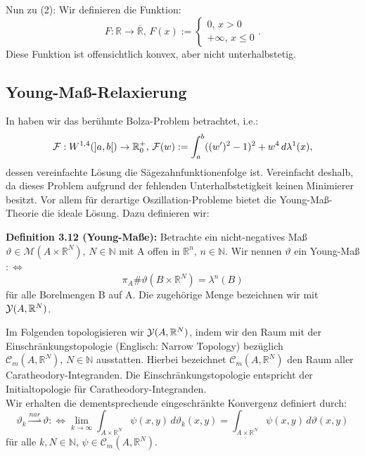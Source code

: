 Nun zu (2): Wir definieren die Funktion:
\begin{equation}
    F:\mathbb{R} \to \overline{\mathbb{R}},\,F(x):=\begin{cases}0, \,x > 0 \\+ \infty, \, x \leq 0 \end{cases}.
\end{equation}
Diese Funktion ist offensichtlich konvex, aber nicht unterhalbstetig.\QEDB

\subsection{Young-Maß-Relaxierung}{\label{subsec:relaxyoung}}
In \cite{RelaxPaper} haben wir das berühmte Bolza-Problem betrachtet, i.e.:
\begin{equation}{\label{eq3.34}}
    \mathcal{F}:W^{1,4}(]a,b[) \to \mathbb{R}_0^+,\,\mathcal{F}(w) := \int_{a}^b ((w')^2 - 1)^2 + w^4\,d\lambda^1(x),
\end{equation}
dessen vereinfachte Lösung die Sägezahnfunktionenfolge ist. Vereinfacht deshalb, da dieses Problem aufgrund der fehlenden Unterhalbstetigkeit keinen Minimierer besitzt. Vor allem für derartige Oszillation-Probleme bietet die Young-Maß-Theorie die ideale Lösung. Dazu definieren wir:\\[0.5cm]
\colorbox{generalYellow}{\begin{minipage}{16cm}{\textcolor{black}{}{\label{def3.12}}}
\textbf{Definition 3.12 (Young-Maße):} Betrachte ein nicht-negatives Maß \(\vartheta \in \mathcal{M}(A \times \mathbb{R}^N), \, N \in \mathbb{N}\) mit A offen in \(\mathbb{R}^n, \, n \in \mathbb{N}\). Wir nennen \(\vartheta\) ein Young-Maß \(: \Leftrightarrow\)
\begin{equation}
    \pi_A \# \vartheta(B \times \mathbb{R}^N) = \lambda^n(B)
\end{equation}
für alle Borelmengen B auf A. Die zugehörige Menge bezeichnen wir mit \(\mathcal{Y}(A,\mathbb{R}^N)\).
\end{minipage}}

Im Folgenden topologisieren wir \(\mathcal{Y}(A,\mathbb{R}^N)\), indem wir den Raum mit der \\Einschränkungstopologie (Englisch: Narrow Topology) bezüglich \(\mathcal{C}_m(A,\mathbb{R}^N), \, N \in \mathbb{N}\) ausstatten. Hierbei bezeichnet \(\mathcal{C}_m(A,\mathbb{R}^N)\) den Raum aller Caratheodory-Integranden. Die Einschränkungstopologie entspricht der Initialtopologie für Caratheodory-Integranden.\\
Wir erhalten die dementsprechende eingeschränkte Konvergenz definiert durch:
\begin{equation}
    \vartheta_k \stackrel{nar}{\rightharpoonup} \vartheta :\Leftrightarrow \lim_{k \to \infty} \int_{A \times \mathbb{R}^N} \psi (x,y) \, d\vartheta_k (x,y) = \int_{A \times \mathbb{R}^N} \psi(x,y) \, d\vartheta(x,y)
\end{equation}
für alle \(k,N \in \mathbb{N}, \, \psi \in \mathcal{C}_m(A,\mathbb{R}^N)\).\\

